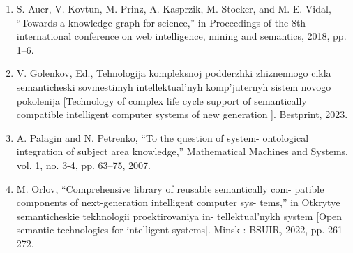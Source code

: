 ﻿\documentclass[a4paper]{article}
\begin{document}
\begin{multicols}{2}
\begin{enumerate}
\item S. Auer, V. Kovtun, M. Prinz, A. Kasprzik, M. Stocker, and M. E.
Vidal, “Towards a knowledge graph for science,” in Proceedings
of the 8th international conference on web intelligence, mining
and semantics, 2018, pp. 1–6.

\item V. Golenkov, Ed., Tehnologija kompleksnoj podderzhki
zhiznennogo cikla semanticheski sovmestimyh intellektual’nyh
komp’juternyh sistem novogo pokolenija [Technology of complex
life cycle support of semantically compatible intelligent computer
systems of new generation ]. Bestprint, 2023.

\item A. Palagin and N. Petrenko, “To the question of system-
ontological integration of subject area knowledge,” Mathematical
Machines and Systems, vol. 1, no. 3-4, pp. 63–75, 2007.

\item M. Orlov, “Comprehensive library of reusable semantically com-
patible components of next-generation intelligent computer sys-
tems,” in Otkrytye semanticheskie tekhnologii proektirovaniya in-
tellektual’nykh system [Open semantic technologies for intelligent
systems]. Minsk : BSUIR, 2022, pp. 261–272.
\end{enumerate}



\end{multicols}
\end{document}
